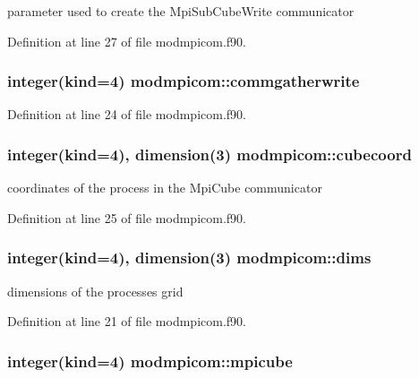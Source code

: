 parameter used to create the Mpi\+Sub\+Cube\+Write communicator 



Definition at line 27 of file modmpicom.\+f90.

\subsubsection[{\texorpdfstring{commgatherwrite}{commgatherwrite}}]{\setlength{\rightskip}{0pt plus 5cm}integer(kind=4) modmpicom\+::commgatherwrite}\hypertarget{namespacemodmpicom_a81805e955c1ef5ffb5846c0dad06976f}{}\label{namespacemodmpicom_a81805e955c1ef5ffb5846c0dad06976f}


Definition at line 24 of file modmpicom.\+f90.

\subsubsection[{\texorpdfstring{cubecoord}{cubecoord}}]{\setlength{\rightskip}{0pt plus 5cm}integer(kind=4), dimension(3) modmpicom\+::cubecoord}\hypertarget{namespacemodmpicom_a533718abb8ce3f03b430dfbf9f821069}{}\label{namespacemodmpicom_a533718abb8ce3f03b430dfbf9f821069}


coordinates of the process in the Mpi\+Cube communicator 



Definition at line 25 of file modmpicom.\+f90.

\subsubsection[{\texorpdfstring{dims}{dims}}]{\setlength{\rightskip}{0pt plus 5cm}integer(kind=4), dimension(3) modmpicom\+::dims}\hypertarget{namespacemodmpicom_a8762b65024b222a0c5bfab4f8af21d7d}{}\label{namespacemodmpicom_a8762b65024b222a0c5bfab4f8af21d7d}


dimensions of the processes grid 



Definition at line 21 of file modmpicom.\+f90.

\subsubsection[{\texorpdfstring{mpicube}{mpicube}}]{\setlength{\rightskip}{0pt plus 5cm}integer(kind=4) modmpicom\+::mpicube}\hypertarget{namespacemodmpicom_a85f71373d318b169e73b6a0221dc62f1}{}\label{namespacemodmpicom_a85f71373d318b169e73b6a0221dc62f1}


